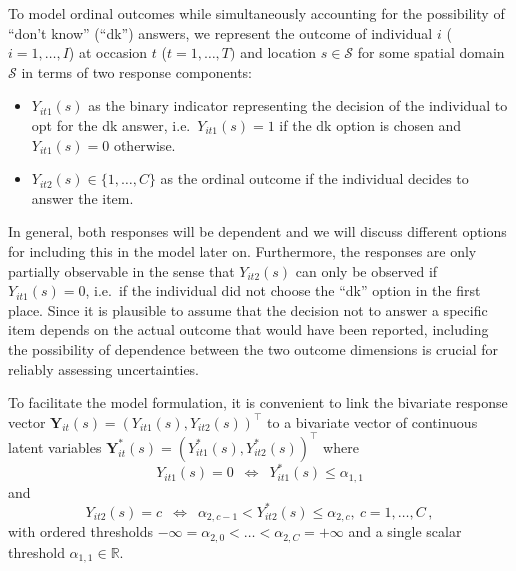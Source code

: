 \documentclass[submit]{smj}
\begin{document}
To model ordinal outcomes while simultaneously accounting for the possibility of \enquote{don't know} (\enquote{dk}) answers, we represent the outcome of individual $i$ ($i=1, \ldots, I$) at occasion $t$ ($t=1, \ldots, T)$ and location $s\in\mathcal{S}$ for some spatial domain $\mathcal{S}$ in terms of two response components:
\begin{itemize}
    \item $Y_{it1}(s)$ as the binary indicator representing the decision of the individual to opt for the dk answer, i.e.\ $Y_{it1}(s)=1$ if the dk option is chosen and $Y_{it1}(s)=0$ otherwise.
    \item $Y_{it2}(s)\in\{1,\ldots,C\}$ as the ordinal outcome if the individual decides to answer the item.
\end{itemize}
In general, both responses will be dependent and we will discuss different options for including this in the model later on. Furthermore, the responses are only partially observable in the sense that $Y_{it2}(s)$ can only be observed if $Y_{it1}(s)=0$, i.e.\ if the individual did not choose the \enquote{dk} option in the first place. Since it is plausible to assume that the decision not to answer a specific item depends on the actual outcome that would have been reported, including the possibility of dependence between the two outcome dimensions is crucial for reliably assessing uncertainties.

To facilitate the model formulation, it is convenient to link the bivariate response vector $\bm{Y}_{it}(s)=(Y_{it1}(s), Y_{it2}(s))^\top$ to a bivariate vector of continuous latent variables $\bm{Y}^*_{it}(s)=(Y^*_{it1}(s), Y^*_{it2}(s))^\top$ where
\[
 Y_{it1}(s) = 0 \enspace\Leftrightarrow\enspace Y^*_{it1}(s) \le \alpha_{1,1}
\]
and
\[
Y_{it2}(s) = c \enspace\Leftrightarrow\enspace \alpha_{2,c-1}< Y^*_{it2}(s) \le \alpha_{2,c},\ c=1,\ldots,C\,,
\]
with ordered thresholds $-\infty= \alpha_{2,0} <\ldots < \alpha_{2,C}=+\infty$ and a single scalar threshold $\alpha_{1,1}\in\mathds{R}$.
 
\end{document}
